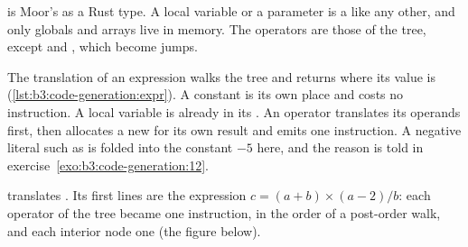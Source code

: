  is Moor's  as a Rust type. A local variable or a parameter is a  like any other, and only globals and arrays live in memory. The operators are those of the tree, except \code{&&} and \code{||}, which become jumps.

\label{lst:b3:code-generation:tac}

The translation of an expression walks the tree and returns where its value is (\cref{lst:b3:code-generation:expr}). A constant is its own place and costs no instruction. A local variable is already in its . An operator translates its operands first, then allocates a new  for its own result and emits one instruction. A negative literal such as  is folded into the constant $-5$ here, and the reason is told in exercise~\ref{exo:b3:code-generation:12}.

\label{lst:b3:code-generation:expr}

 translates . Its first lines are the expression $c = (a + b) \times (a - 2) / b$: each operator of the tree became one instruction, in the order of a post-order walk, and each interior node one  (the figure below).

\label{out:b3:code-generation:tac}

